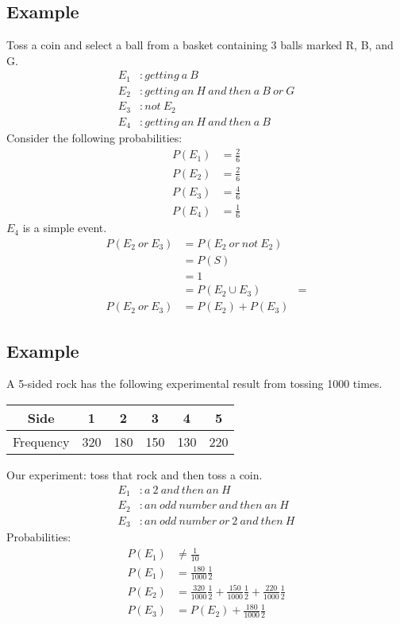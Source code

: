 \documentclass{math}
\begin{document}
\subsection*{Example}
Toss a coin and select a ball from a basket containing 3 balls marked R, B, and
G.
\begin{align*}
  E_{1}&: getting\ a\ B \\
  E_{2}&: getting\ an\ H\ and\ then\ a\ B\ or\ G \\
  E_{3}&: not\ E_{2} \\
  E_{4}&: getting\ an\ H\ and\ then\ a\ B
\end{align*}
Consider the following probabilities:
\begin{align*}
  P(E_{1}) &= \frac{2}{6} \\
  P(E_{2}) &= \frac{2}{6} \\
  P(E_{3}) &= \frac{4}{6} \\
  P(E_{4}) &= \frac{1}{6}
\end{align*}
\( E_{4} \) is a simple event.
\begin{align*}
  P(E_{2}\ or\ E_{3}) &= P(E_{2}\ or\ not\ E_{2}) \\
  &= P(S) \\
  &= 1 \\
  &= P(E_{2} \cup E_{3}) &= \\
  P(E_{2}\ or\ E_{3}) &= P(E_{2}) + P(E_{3})
\end{align*}

\subsection*{Example}
A 5-sided rock has the following experimental result from tossing 1000 times.
\begin{center}
  \begin{tabular}{|c|c|c|c|c|c|}
    \hline
    Side      & 1   & 2   & 3   & 4   & 5 \\
    \hline
    Frequency & 320 & 180 & 150 & 130 & 220 \\
    \hline
  \end{tabular}
\end{center}
Our experiment: toss that rock and then toss a coin.
\begin{align*}
  E_{1}&: a\ 2\ and\ then\ an\ H \\
  E_{2}&: an\ odd\ number\ and\ then\ an\ H \\
  E_{3}&: an\ odd\ number\ or\ 2\ and\ then\ H
\end{align*}
Probabilities:
\begin{align*}
  P(E_{1}) &\neq \frac{1}{10} \\
  P(E_{1}) &= \frac{180}{1000}\frac{1}{2} \\
  P(E_{2}) &= \frac{320}{1000}\frac{1}{2} + \frac{150}{1000}\frac{1}{2}+
    \frac{220}{1000}\frac{1}{2} \\
  P(E_{3}) &= P(E_{2}) + \frac{180}{1000}\frac{1}{2}
\end{align*}
\end{document}
